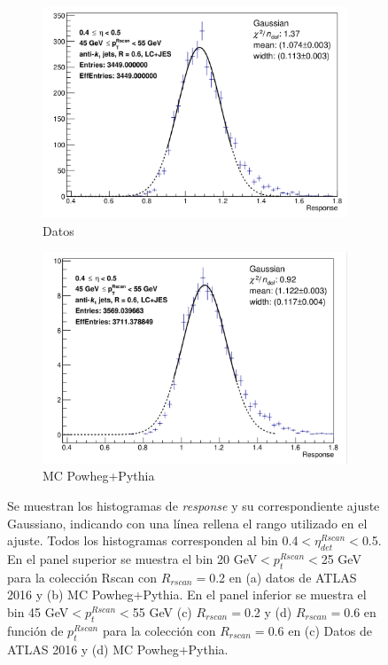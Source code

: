 \begin{figure}[ht]
\begin{subfigure}[b]{0.495\textwidth}
        \includegraphics[width=\textwidth]{images/Data_6lc_49}
        \caption{Datos}
    \end{subfigure}
    \hfill
    \begin{subfigure}[b]{0.495\textwidth}
        \centering
        \includegraphics[width=\textwidth]{images/MC_6lc_49}
        \caption{MC Powheg+Pythia}
    \end{subfigure}
    \caption{ Se muestran los histogramas de \textit{response} y su correspondiente ajuste Gaussiano, indicando con una línea rellena el rango utilizado en el ajuste. Todos los histogramas corresponden al bin 0.4$<\eta^{Rscan}_{det}<$0.5. En el panel superior se muestra el bin 20 GeV$<p_t^{Rscan}<$25 GeV para la colección Rscan con $R_{rscan}=$0.2 en (a) datos de ATLAS 2016 y (b) MC Powheg+Pythia. En el panel inferior se muestra el bin 45 GeV$<p_t^{Rscan}<$55 GeV (c) $R_{rscan}=$0.2 y (d) $R_{rscan}=$0.6 en función de $p_t^{Rscan}$ para la colección con $R_{rscan}=$0.6 en (c) Datos de ATLAS 2016 y (d) MC Powheg+Pythia.} 
    \label{fig:Fits}
\end{figure}

